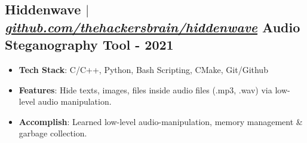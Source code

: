 \documentclass[11pt]{article} %
\begin{document}
\subsection{Hiddenwave $|$ \normalfont\textit{\href{https://github.com/thehackersbrain/hiddenwave}{github.com/thehackersbrain/hiddenwave}} \hfill Audio Steganography Tool - \textbf{2021}}
\vspace{3pt}
\begin{itemize}
  \item \textbf{Tech Stack}: C/C++, Python, Bash Scripting, CMake, Git/Github
  \item \textbf{Features}: Hide texts, images, files inside audio files (.mp3, .wav) via low-level audio manipulation.
  \item \textbf{Accomplish}: Learned low-level audio-manipulation, memory management \& garbage collection.
\end{itemize}
\end{document}
